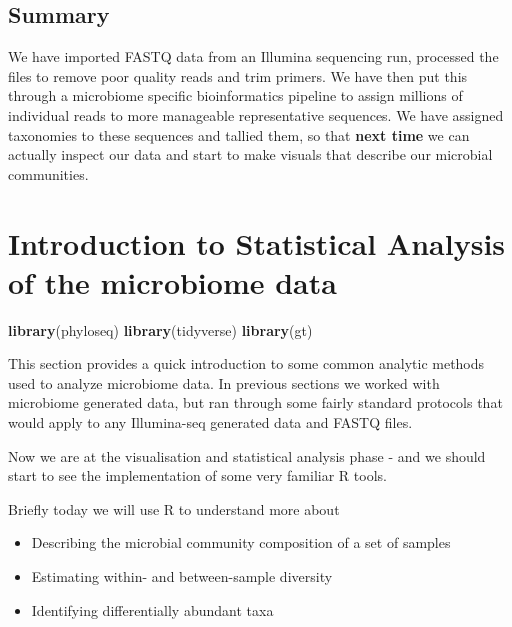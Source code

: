 \documentclass[
]{book}
\newenvironment{Shaded}{\begin{snugshade}}{\end{snugshade}}
\newcommand{\FunctionTok}[1]{\textcolor[rgb]{0.13,0.29,0.53}{\textbf{#1}}}
\newcommand{\NormalTok}[1]{#1}
\begin{document}
\hypertarget{summary-2}{%
\section{Summary}\label{summary-2}}

We have imported FASTQ data from an Illumina sequencing run, processed the files to remove poor quality reads and trim primers. We have then put this through a microbiome specific bioinformatics pipeline to assign millions of individual reads to more manageable representative sequences. We have assigned taxonomies to these sequences and tallied them, so that \textbf{next time} we can actually inspect our data and start to make visuals that describe our microbial communities.

\hypertarget{introduction-to-statistical-analysis-of-the-microbiome-data}{%
\chapter{Introduction to Statistical Analysis of the microbiome data}\label{introduction-to-statistical-analysis-of-the-microbiome-data}}

\begin{Shaded}
\begin{Highlighting}[]
\FunctionTok{library}\NormalTok{(phyloseq)}
\FunctionTok{library}\NormalTok{(tidyverse)}
\FunctionTok{library}\NormalTok{(gt)}
\end{Highlighting}
\end{Shaded}

This section provides a quick introduction to some common analytic methods used to analyze microbiome data.
In previous sections we worked with microbiome generated data, but ran through some fairly standard protocols that would apply to any Illumina-seq generated data and FASTQ files.

Now we are at the visualisation and statistical analysis phase - and we should start to see the implementation of some very familiar R tools.

Briefly today we will use R to understand more about

\begin{itemize}
\item
  Describing the microbial community composition of a set of samples
\item
  Estimating within- and between-sample diversity
\item
  Identifying differentially abundant taxa
\end{itemize}
\end{document}

